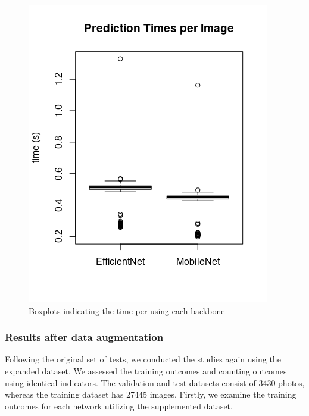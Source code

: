 \begin{figure}[h!]
    \centering
    \includegraphics[width = .4\linewidth]{Figures/times.png}
    \caption{Boxplots indicating the time per using each backbone}
    \label{fig:times}
\end{figure}

\subsubsection{Results after data augmentation}

Following the original set of tests, we conducted the studies again using the expanded dataset. We assessed the training outcomes and counting outcomes using identical indicators. The validation and test datasets consist of 3430 photos, whereas the training dataset has 27445 images. Firstly, we examine the training outcomes for each network utilizing the supplemented dataset.

